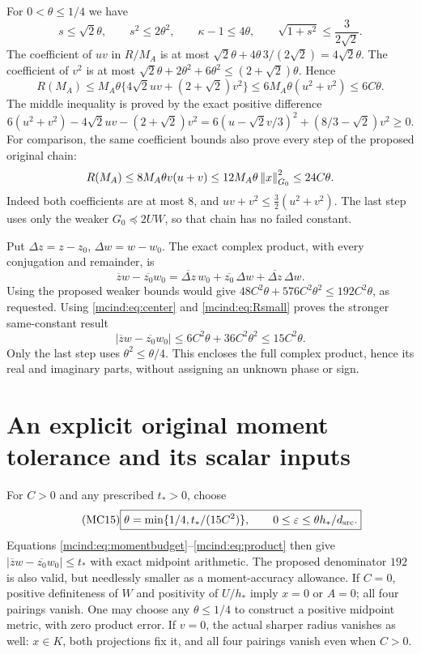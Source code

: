 \documentclass[11pt]{article}
\begin{document}
For $0<\theta\le1/4$ we have
\[
 s\le\sqrt2\theta,\qquad s^2\le2\theta^2,\qquad
 \kappa-1\le4\theta,\qquad
 \sqrt{1+s^2}\le\frac3{2\sqrt2}.
\]
The coefficient of $uv$ in $R/M_A$ is at most
$\sqrt2\theta+4\theta\,3/(2\sqrt2)=4\sqrt2\theta$.
The coefficient of $v^2$ is at most
$\sqrt2\theta+2\theta^2+6\theta^2
\le(2+\sqrt2)\theta$. Hence
\begin{equation}\tag{MC13}\label{mcind:eq:Rsmall}
 R(M_A)\le M_A\theta\{4\sqrt2uv+(2+\sqrt2)v^2\}
          \le6M_A\theta(u^2+v^2)\le6C\theta.
\end{equation}
The middle inequality is proved by the exact positive difference
\[
 6(u^2+v^2)-4\sqrt2uv-(2+\sqrt2)v^2
 =6(u-\sqrt2v/3)^2+(8/3-\sqrt2)v^2\ge0.
\]
For comparison, the same coefficient bounds also prove every
step of the proposed original chain:
\[
 R(M_A)\le8M_A\theta v(u+v)
 \le12M_A\theta\left\lVert x\right\rVert_{G_0}^2\le24C\theta.
\]
Indeed both coefficients are at most $8$, and
$uv+v^2\le\tfrac32(u^2+v^2)$. The last step uses only the
weaker $G_0\preceq2UW$, so that chain has no failed constant.

Put $\Delta z=z-z_0$, $\Delta w=w-w_0$. The exact complex
product, with every conjugation and remainder, is
\[
 \overline z w-\overline{z_0}w_0
  =\overline{\Delta z}\,w_0+\overline{z_0}\,\Delta w
                          +\overline{\Delta z}\,\Delta w.
\]
Using the proposed weaker bounds would give
$48C^2\theta+576C^2\theta^2\le192C^2\theta$, as requested.
Using \eqref{mcind:eq:center} and \eqref{mcind:eq:Rsmall} proves the stronger
same-constant result
\begin{equation}\tag{MC14}\label{mcind:eq:product}
 \boxed{|\overline z w-\overline{z_0}w_0|
       \le6C^2\theta+36C^2\theta^2\le15C^2\theta.}
\end{equation}
Only the last step uses $\theta^2\le\theta/4$. This encloses
the full complex product, hence its real and imaginary parts,
without assigning an unknown phase or sign.

\section{An explicit original moment tolerance and its scalar inputs}

For $C>0$ and any prescribed $t_*>0$, choose
\begin{equation}\tag{MC15}\label{mcind:eq:final}
 \boxed{\theta=\min\{1/4,t_*/(15C^2)\},\qquad
 0\le\varepsilon\le\theta h_*/d_{\rm src}.}
\end{equation}
Equations \eqref{mcind:eq:momentbudget}--\eqref{mcind:eq:product} then give
$|\overline z w-\overline{z_0}w_0|\le t_*$ with exact midpoint
arithmetic. The proposed denominator $192$ is also valid, but
needlessly smaller as a moment-accuracy allowance. If $C=0$,
positive definiteness of $W$ and positivity of $U/h_*$ imply
$x=0$ or $A=0$; all four pairings vanish. One may choose any
$\theta\le1/4$ to construct a positive midpoint metric, with
zero product error. If $v=0$, the actual sharper radius vanishes
as well: $x\in K$, both projections fix it, and all four pairings
vanish even when $C>0$.
\end{document}
